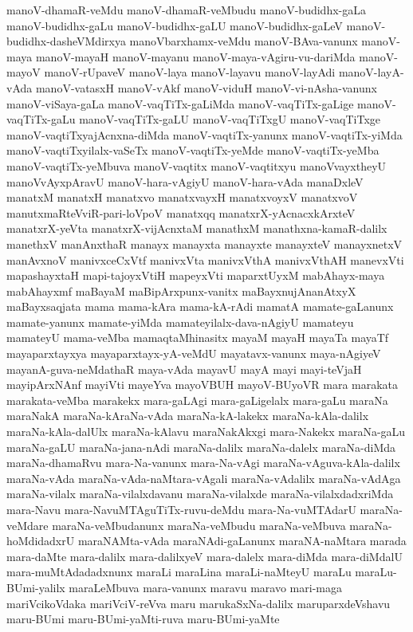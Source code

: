 {manoV-dhamaR-veMdu
manoV-dhamaR-veMbudu
manoV-budidhx-gaLa
manoV-budidhx-gaLu
manoV-budidhx-gaLU
manoV-budidhx-gaLeV
manoV-budidhx-dasheVMdirxya
manoVbarxhamx-veMdu
manoV-BAva-vanunx
manoV-maya
manoV-mayaH
manoV-mayanu
manoV-maya-vAgiru-vu-dariMda
manoV-mayoV
manoV-rUpaveV
manoV-laya
manoV-layavu
manoV-layAdi
manoV-layA-vAda
manoV-vatasxH
manoV-vAkf
manoV-viduH
manoV-vi-nAsha-vanunx
manoV-viSaya-gaLa
manoV-vaqTiTx-gaLiMda
manoV-vaqTiTx-gaLige
manoV-vaqTiTx-gaLu
manoV-vaqTiTx-gaLU
manoV-vaqTiTxgU
manoV-vaqTiTxge
manoV-vaqtiTxyajAcnxna-diMda
manoV-vaqtiTx-yanunx
manoV-vaqtiTx-yiMda
manoV-vaqtiTxyilalx-vaSeTx
manoV-vaqtiTx-yeMde
manoV-vaqtiTx-yeMba
manoV-vaqtiTx-yeMbuva
manoV-vaqtitx
manoV-vaqtitxyu
manoVvayxtheyU
manoVvAyxpAravU
manoV-hara-vAgiyU
manoV-hara-vAda
manaDxleV
manatxM
manatxH
manatxvo
manatxvayxH
manatxvoyxV
manatxvoV
manutxmaRteVviR-pari-loVpoV
manatxqq
manatxrX-yAcnacxkArxteV
manatxrX-yeVta
manatxrX-vijAcnxtaM
manathxM
manathxna-kamaR-dalilx
manethxV
manAnxthaR
manayx
manayxta
manayxte
manayxteV
manayxnetxV
manAvxnoV
manivxceCxVtf
manivxVta
manivxVthA
manivxVthAH
manevxVti
mapashayxtaH
mapi-tajoyxVtiH
mapeyxVti
maparxtUyxM
mabAhayx-maya
mabAhayxmf
maBayaM
maBipArxpunx-vanitx
maBayxnujAnanAtxyX
maBayxsaqjata
mama
mama-kAra
mama-kA-rAdi
mamatA
mamate-gaLanunx
mamate-yanunx
mamate-yiMda
mamateyilalx-dava-nAgiyU
mamateyu
mamateyU
mama-veMba
mamaqtaMhinasitx
mayaM
mayaH
mayaTa
mayaTf
mayaparxtayxya
mayaparxtayx-yA-veMdU
mayatavx-vanunx
maya-nAgiyeV
mayanA-guva-neMdathaR
maya-vAda
mayavU
mayA
mayi
mayi-teVjaH
mayipArxNAnf
mayiVti
mayeYva
mayoVBUH
mayoV-BUyoVR
mara
marakata
marakata-veMba
marakekx
mara-gaLAgi
mara-gaLigelalx
mara-gaLu
maraNa
maraNakA
maraNa-kAraNa-vAda
maraNa-kA-lakekx
maraNa-kAla-dalilx
maraNa-kAla-dalUlx
maraNa-kAlavu
maraNakAkxgi
mara-Nakekx
maraNa-gaLu
maraNa-gaLU
maraNa-jana-nAdi
maraNa-dalilx
maraNa-dalelx
maraNa-diMda
maraNa-dhamaRvu
mara-Na-vanunx
mara-Na-vAgi
maraNa-vAguva-kAla-dalilx
maraNa-vAda
maraNa-vAda-naMtara-vAgali
maraNa-vAdalilx
maraNa-vAdAga
maraNa-vilalx
maraNa-vilalxdavanu
maraNa-vilalxde
maraNa-vilalxdadxriMda
mara-Navu
mara-NavuMTAguTiTx-ruvu-deMdu
mara-Na-vuMTAdarU
maraNa-veMdare
maraNa-veMbudanunx
maraNa-veMbudu
maraNa-veMbuva
maraNa-hoMdidadxrU
maraNAMta-vAda
maraNAdi-gaLanunx
maraNA-naMtara
marada
mara-daMte
mara-dalilx
mara-dalilxyeV
mara-dalelx
mara-diMda
mara-diMdalU
mara-muMtAdadadxnunx
maraLi
maraLina
maraLi-naMteyU
maraLu
maraLu-BUmi-yalilx
maraLeMbuva
mara-vanunx
maravu
maravo
mari-maga
mariVcikoVdaka
mariVciV-reVva
maru
marukaSxNa-dalilx
maruparxdeVshavu
maru-BUmi
maru-BUmi-yaMti-ruva
maru-BUmi-yaMte
}
